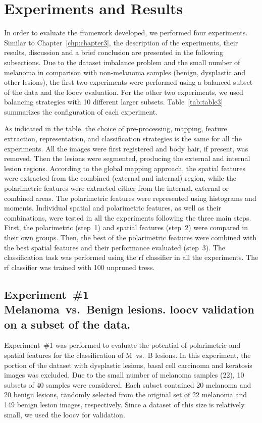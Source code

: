 \section{Experiments and Results}
\label{sec:chp5-sec6}
In order to evaluate the framework developed, we performed four experiments.
Similar to Chapter~\ref{chp:chapter3}, the description of the experiments, their results, discussion and a brief conclusion are presented in the following subsections.
Due to the dataset imbalance problem and the small number of melanoma in comparison with non-melanoma samples (benign, dysplastic and other lesions), the first two experiments were performed using a balanced subset of the data and the \acf{loocv} evaluation.
For the other two experiments, we used balancing strategies with 10 different larger subsets.
Table~\ref{tab:table3} summarizes the configuration of each experiment.

As indicated in the table, the choice of pre-processing, mapping, feature extraction, representation, and classification strategies is the same for all the experiments.
All the images were first registered and body hair, if present, was removed.
Then the lesions were segmented, producing the external and internal lesion regions.
According to the global mapping approach, the spatial features were extracted from the combined (external and internal) region, while the polarimetric features were extracted either from the internal, external or combined areas.
The polarimetric features were represented using histograms and moments.
Individual spatial and polarimetric features, as well as their combinations, were tested in all the experiments following the three main steps.
First, the polarimetric (step~1) and spatial features (step~2) were compared in their own groups.
Then, the best of the polarimetric features were combined with the best spatial features and their performance evaluated (step~3). 
The classification task was performed using the \ac{rf} classifier in all the experiments.
The \acl{rf} classifier was trained with 100 unpruned tress.



\subsection{Experiment~\#1\\
\small{Melanoma~vs.~Benign lesions. \ac{loocv} validation on a subset of the data.}}
Experiment~\#1 was performed to evaluate the potential of polarimetric and spatial features for the classification of M~vs.~B lesions.
In this experiment, the portion of the dataset with dysplastic lesions, basal cell carcinoma and keratosis images was excluded.
Due to the small number of melanoma samples (22), 10 subsets of 40 samples were considered.
Each subset contained 20 melanoma and 20 benign lesions, randomly selected from the original set of 22 melanoma and 149 benign lesion images, respectively.
Since a dataset of this size is relatively small, we used the \ac{loocv} for validation.

